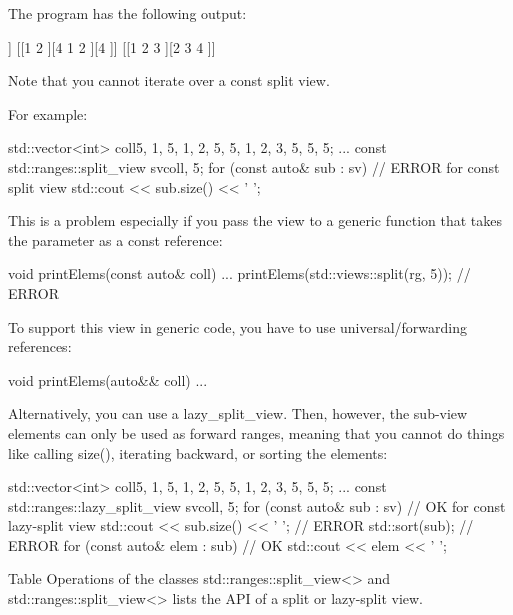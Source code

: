 The program has the following output:

\begin{shell}
[1 2 3 4 1 2 3 4 ]
[[1 ][3 4 1 ][3 4 ]]
[[1 2 ][4 1 2 ][4 ]]
[[1 2 3 ][2 3 4 ]]
\end{shell}


Note that you cannot iterate over a const split view.

For example:

\begin{cpp}
std::vector<int> coll{5, 1, 5, 1, 2, 5, 5, 1, 2, 3, 5, 5, 5};
...
const std::ranges::split_view sv{coll, 5};
for (const auto& sub : sv) { // ERROR for const split view
	std::cout << sub.size() << ' ';
}
\end{cpp}

This is a problem especially if you pass the view to a generic function that takes the parameter as a const reference:

\begin{cpp}
void printElems(const auto& coll) {
	...
}
printElems(std::views::split(rg, 5)); // ERROR
\end{cpp}

To support this view in generic code, you have to use universal/forwarding references:

\begin{cpp}
void printElems(auto&& coll) {
	...
}
\end{cpp}

Alternatively, you can use a lazy\_split\_view. Then, however, the sub-view elements can only be used as forward ranges, meaning that you cannot do things like calling size(), iterating backward, or sorting the elements:

\begin{cpp}
std::vector<int> coll{5, 1, 5, 1, 2, 5, 5, 1, 2, 3, 5, 5, 5};
...
const std::ranges::lazy_split_view sv{coll, 5};
for (const auto& sub : sv) { // OK for const lazy-split view
	std::cout << sub.size() << ' '; // ERROR
	std::sort(sub); // ERROR
	for (const auto& elem : sub) { // OK
		std::cout << elem << ' ';
	}
}
\end{cpp}


Table Operations of the classes std::ranges::split\_view<> and std::ranges::split\_view<> lists the API of a split or lazy-split view.

